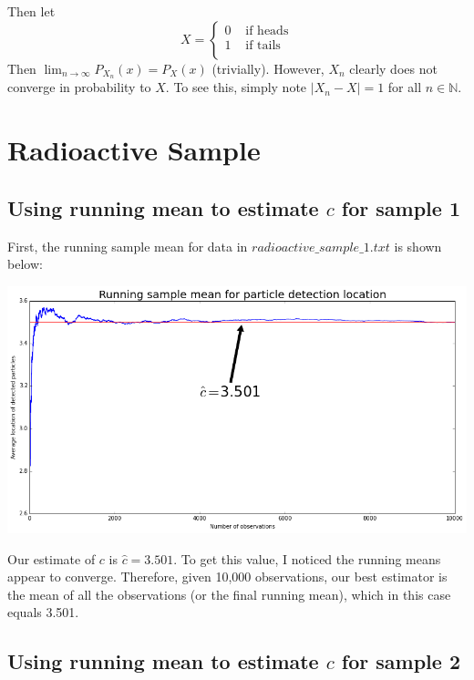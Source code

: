 \documentclass[paper=a4, fontsize=11pt]{scrartcl} %
\numberwithin{equation}{section} %
\numberwithin{figure}{section} %
\numberwithin{table}{section} %
\begin{document}
Then let 
\[
X=
\begin{cases}
 0 & \textrm{  if heads} \\
 1 & \textrm{  if tails}\\
\end{cases}
\]
Then $\lim_{n \to \infty} P_{X_n}(x) = P_X(x)$ (trivially). However, $X_n$ clearly does not converge in probability to $X$. To see this, simply note $|X_n - X| = 1$ for all $n \in \mathbb{N}$.


\section{Radioactive Sample}

\subsection{Using running mean to estimate $c$ for sample 1}

First, the running sample mean for data in $radioactive\_sample\_1.txt$ is shown below:

\includegraphics[scale=0.5]{Q4a_fig}

Our estimate of $c$ is $\hat{c} = 3.501$. To get this value, I noticed the running means appear to converge. Therefore, given 10,000 observations, our best estimator is the mean of all the observations (or the final running mean), which in this case equals 3.501.

\subsection{Using running mean to estimate $c$ for sample 2}
\end{document}
